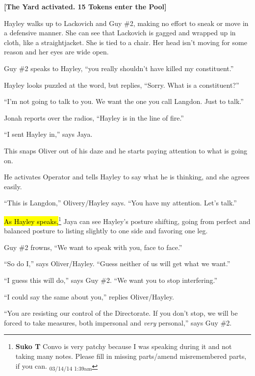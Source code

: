 \textbf{{[}The Yard activated.  15 Tokens enter the Pool{]}}



Hayley walks up to Lackovich and Guy \#2, making no effort to sneak or move in a defensive manner. She can see that Lackovich is gagged and wrapped up in cloth, like a straightjacket. She is tied to a chair.  Her head isn't moving for some reason and her eyes are wide open.



Guy \#2 speaks to Hayley, ``you really shouldn't have killed my constituent.''

Hayley looks puzzled at the word, but replies, ``Sorry.  What is a constituent?''

``I'm not going to talk to you.  We want the one you call Langdon.  Just to talk.''



Jonah reports over the radios, ``Hayley is in the line of fire.''

``I sent Hayley in,'' says Jaya.



This snaps Oliver out of his daze and he starts paying attention to what is going on.

He activates Operator and tells Hayley to say what he is thinking, and she agrees easily.

``This is Langdon,'' Olivery/Hayley says. ``You have my attention.  Let's talk.''

\hl{As Hayley speaks,}\footnote{\textbf{Suko T }Convo is very patchy because I was speaking during it and not taking many notes.  Please fill in missing parts/amend misremembered parts, if you can. \textsubscript{03/14/14 1:39am}} Jaya can see Hayley's posture shifting, going from perfect and balanced posture to listing slightly to one side and favoring one leg.



Guy \#2 frowns, ``We want to speak with you, face to face.''

``So do I,'' says Oliver/Hayley.  ``Guess neither of us will get what we want.''

``I guess this will do,'' says Guy \#2.  ``We want you to stop interfering.''

``I could say the same about you,'' replies Oliver/Hayley.



``You are resisting our control of the Directorate.  If you don't stop, we will be forced to take measures, both impersonal and \textit{very} personal,'' says Guy \#2.



